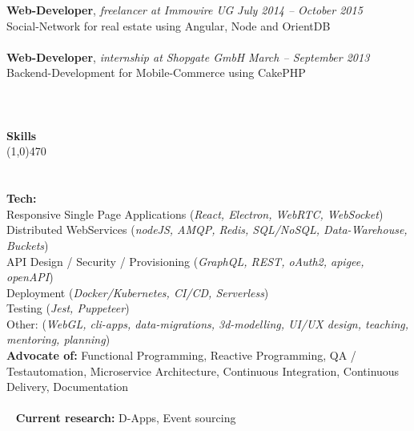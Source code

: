 \documentclass[10pt]{article} %
\begin{document}
\noindent
{\bf Web-Developer}, \textit{freelancer at Immowire UG}  \hfill \textit{ July 2014 -- October 2015 } \\ 
Social-Network for real estate using Angular, Node and OrientDB\\\\
\noindent
{\bf Web-Developer}, \textit{internship at Shopgate GmbH}  \hfill \textit{ March -- September 2013 } \\ 
Backend-Development for Mobile-Commerce using CakePHP\\\\
\noindent
\\\\
{\Large \bf Skills}\\
\line(1,0){470}\\
\\\\
\noindent
{\bf Tech:} \\
Responsive Single Page Applications (\textit{React, Electron, WebRTC, WebSocket}) \\
Distributed WebServices (\textit{nodeJS, AMQP, Redis, SQL/NoSQL, Data-Warehouse, Buckets}) \\
API Design / Security / Provisioning (\textit{GraphQL, REST, oAuth2, apigee, openAPI}) \\
Deployment (\textit{Docker/Kubernetes, CI/CD, Serverless}) \\
Testing (\textit{Jest, Puppeteer}) \\
Other: (\textit{WebGL, cli-apps, data-migrations, 3d-modelling, UI/UX design, teaching, mentoring, planning}) \\
\noindent
{\bf Advocate of:} Functional Programming, Reactive Programming, QA / Testautomation, Microservice Architecture, Continuous Integration, Continuous Delivery, Documentation \\\\\
\noindent
{\bf Current research:} D-Apps, Event sourcing \\\\\
\end{document}
